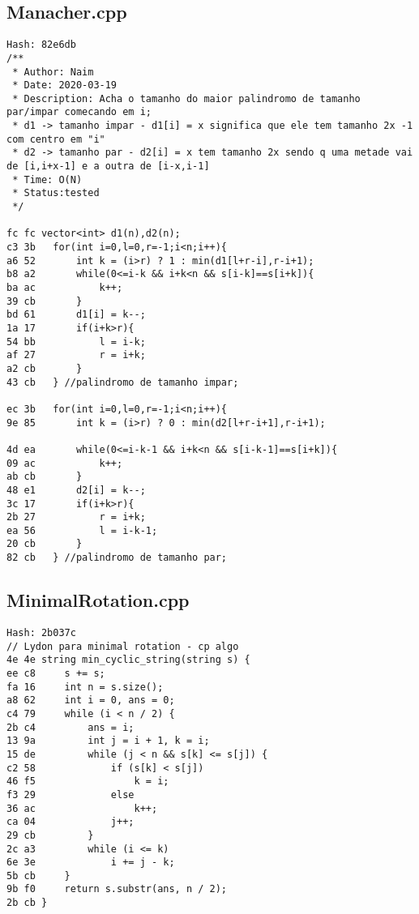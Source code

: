 \documentclass[11pt, a4paper, twoside]{article}
\begin{document}
\subsection{Manacher.cpp}
\begin{lstlisting}
Hash: 82e6db
/**
 * Author: Naim
 * Date: 2020-03-19
 * Description: Acha o tamanho do maior palindromo de tamanho par/impar comecando em i;
 * d1 -> tamanho impar - d1[i] = x significa que ele tem tamanho 2x -1 com centro em "i"
 * d2 -> tamanho par - d2[i] = x tem tamanho 2x sendo q uma metade vai de [i,i+x-1] e a outra de [i-x,i-1]
 * Time: O(N)
 * Status:tested
 */

fc fc vector<int> d1(n),d2(n);
c3 3b 	for(int i=0,l=0,r=-1;i<n;i++){
a6 52 		int k = (i>r) ? 1 : min(d1[l+r-i],r-i+1);
b8 a2 		while(0<=i-k && i+k<n && s[i-k]==s[i+k]){
ba ac 			k++;
39 cb 		}
bd 61 		d1[i] = k--;
1a 17 		if(i+k>r){
54 bb 			l = i-k;
af 27 			r = i+k;
a2 cb 		}
43 cb 	} //palindromo de tamanho impar;
	
ec 3b 	for(int i=0,l=0,r=-1;i<n;i++){
9e 85 		int k = (i>r) ? 0 : min(d2[l+r-i+1],r-i+1);
      		
4d ea 		while(0<=i-k-1 && i+k<n && s[i-k-1]==s[i+k]){
09 ac 			k++;
ab cb 		}
48 e1 		d2[i] = k--;
3c 17 		if(i+k>r){
2b 27 			r = i+k;
ea 56 			l = i-k-1;
20 cb 		}
82 cb 	} //palindromo de tamanho par;
\end{lstlisting}

\subsection{MinimalRotation.cpp}
\begin{lstlisting}
Hash: 2b037c
// Lydon para minimal rotation - cp algo
4e 4e string min_cyclic_string(string s) {
ee c8     s += s;
fa 16     int n = s.size();
a8 62     int i = 0, ans = 0;
c4 79     while (i < n / 2) {
2b c4         ans = i;
13 9a         int j = i + 1, k = i;
15 de         while (j < n && s[k] <= s[j]) {
c2 58             if (s[k] < s[j])
46 f5                 k = i;
f3 29             else
36 ac                 k++;
ca 04             j++;
29 cb         }
2c a3         while (i <= k)
6e 3e             i += j - k;
5b cb     }
9b f0     return s.substr(ans, n / 2);
2b cb }
\end{lstlisting}
\end{document}

